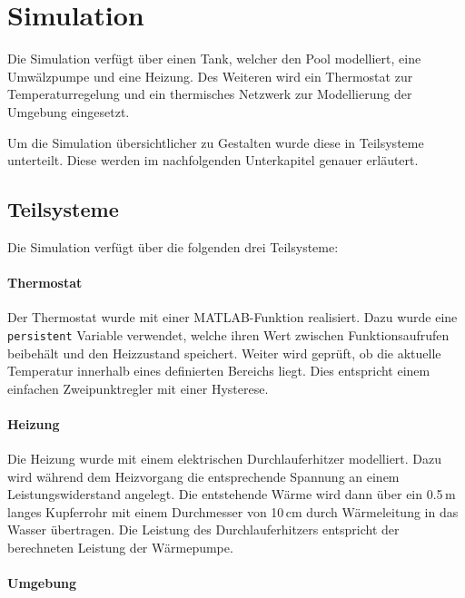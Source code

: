 \section{Simulation}
\label{sec:Simulation}
Die Simulation verfügt über einen Tank, welcher den Pool modelliert, eine Umwälzpumpe und eine Heizung. Des Weiteren wird ein Thermostat zur Temperaturregelung und ein thermisches Netzwerk zur Modellierung der Umgebung eingesetzt.

Um die Simulation übersichtlicher zu Gestalten wurde diese in Teilsysteme unterteilt. Diese werden im nachfolgenden Unterkapitel genauer erläutert.

\subsection{Teilsysteme}
\label{subsec:Teilsysteme}
Die Simulation verfügt über die folgenden drei Teilsysteme:

\paragraph{Thermostat}
Der Thermostat wurde mit einer MATLAB-Funktion realisiert. Dazu wurde eine \texttt{persistent} Variable verwendet, welche ihren Wert zwischen Funktionsaufrufen beibehält und den Heizzustand speichert. Weiter wird geprüft, ob die aktuelle Temperatur innerhalb eines definierten Bereichs liegt. Dies entspricht einem einfachen Zweipunktregler mit einer Hysterese.

\paragraph{Heizung}
Die Heizung wurde mit einem elektrischen Durchlauferhitzer modelliert. Dazu wird während dem Heizvorgang die entsprechende Spannung an einem Leistungswiderstand angelegt. Die entstehende Wärme wird dann über ein 0.5\,m langes Kupferrohr mit einem Durchmesser von 10\,cm durch Wärmeleitung in das Wasser übertragen. Die Leistung des Durchlauferhitzers entspricht der berechneten Leistung der Wärmepumpe.

\paragraph{Umgebung}
